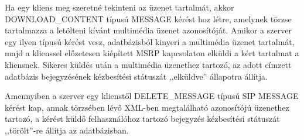 Ha egy kliens meg szeretné tekinteni az üzenet tartalmát, akkor DOWNLOAD\_CONTENT típusú MESSAGE kérést hoz létre, amelynek törzse tartalmazza a letölteni kívánt multimédia üzenet azonosítóját. Amikor a szerver egy ilyen típusú kérést vesz, adatbázisból kinyeri a multimédia üzenet tartalmát, majd a klienssel előzetesen kiépített MSRP kapcsolaton elküldi a kért tartalmat a kliensnek. Sikeres küldés után a multimédia üzenethez tartozó, az adott címzett adatbázis bejegyzésének kézbesítési státuszát ,,elküldve'' állapotra állítja.

Amennyiben a szerver egy klienstől DELETE\_MESSAGE típusú SIP MESSAGE kérést kap, annak törzsében lévő XML-ben megtalálható azonosítójú üzenethez tartozó, a kérést küldő felhasználóhoz tartozó bejegyzés kézbesítési státuszát ,,törölt''-re állítja az adatbázisban.  